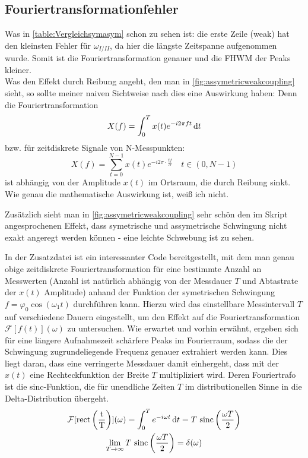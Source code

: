 \subsection{Fouriertransformationfehler}
Was in \cref{table:Vergleichsymasym} schon zu sehen ist: die erste Zeile (weak) hat den kleinsten Fehler für \(\omega_{I/II}\), da hier die längste Zeitspanne aufgenommen wurde. Somit ist die Fouriertransformation genauer und die FHWM der Peaks kleiner. \\
Was den Effekt durch Reibung angeht, den man in \cref{fig:assymetricweakcoupling} sieht, so sollte meiner naiven Sichtweise nach dies eine Auswirkung haben: Denn die Fouriertransformation
\begin{equation}
    X(f)=\int_{0}^{T}x(t)e^{-i2\pi ft}\mathop{}\!\mathrm{d} t
\end{equation}
bzw. für zeitdiskrete Signale von N-Messpunkten:
\begin{equation}
    X(f)=\sum_{t=0}^{N-1}x(t)e^{-i2\pi \cdot \frac{tf}{N}}\quad t\in(0,N-1)
\end{equation}
ist abhängig von der Amplitude \(x(t)\) im Ortsraum, die durch Reibung sinkt. Wie genau die mathematische Auswirkung ist, weiß ich nicht.
\par
Zusätzlich sieht man in \cref{fig:assymetricweakcoupling} sehr schön den im Skript angesprochenen Effekt, dass symetrische und assymetrische Schwingung nicht exakt angeregt werden können - eine leichte Schwebung ist zu sehen.\par
In der Zusatzdatei \autocite{Dimitrij} ist ein interessanter Code bereitgestellt, mit dem man genau obige zeitdiskrete Fouriertransformation für eine bestimmte Anzahl an Messwerten (Anzahl ist natürlich abhängig von der Messdauer \(T\) und Abtastrate der \(x(t)\) Amplitude) anhand der Funktion der symetrischen Schwingung \(f=\varphi_0\cos(\omega_1t)\) durchführen kann. Hierzu wird das einstellbare Messintervall \(T\) auf verschiedene Dauern eingestellt, um den Effekt auf die Fouriertransformation \(\mathcal{F}[f(t)](\omega)\) zu untersuchen. Wie erwartet und vorhin erwähnt, ergeben sich für eine längere Aufnahmezeit schärfere Peaks im Fourierraum, sodass die der Schwingung zugrundeliegende Frequenz genauer extrahiert werden kann. Dies liegt daran, dass eine verringerte Messdauer damit einhergeht, dass mit der \(x(t)\) eine Rechteckfunktion der Breite \(T\) multipliziert wird. Deren Fouriertrafo ist die sinc-Funktion, die für unendliche Zeiten \(T\) im distributionellen Sinne in die Delta-Distribution übergeht\autocite{sincfunction}.
\begin{gather*}
  \mathcal{F}[\mathrm{rect\left(\frac{t}{T}\right)}](\omega)=\int_{0}^{T}e^{-i\omega t} \mathop{}\!\mathrm{d} t= T\,\operatorname{sinc}\left(\frac{\omega T}{2}\right)\\
  \lim_{T\to\infty}T\,\operatorname{sinc}\left(\frac{\omega T}{2}\right)=\delta(\omega)
\end{gather*}

